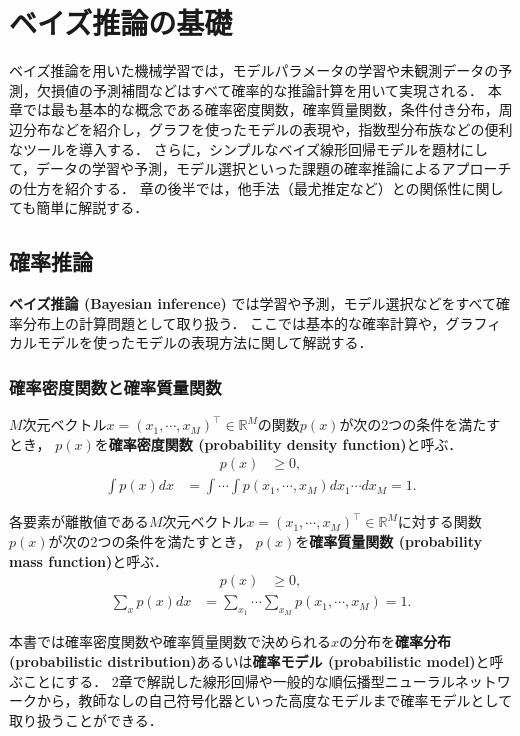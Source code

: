 \documentclass[11pt,a4paper]{jsarticle}
\numberwithin{equation}{section}
\begin{document}
	
\setcounter{section}{2}

\section{ベイズ推論の基礎}
ベイズ推論を用いた機械学習では，モデルパラメータの学習や未観測データの予測，欠損値の予測補間などはすべて確率的な推論計算を用いて実現される．
本章では最も基本的な概念である確率密度関数，確率質量関数，条件付き分布，周辺分布などを紹介し，グラフを使ったモデルの表現や，指数型分布族などの便利なツールを導入する．
さらに，シンプルなベイズ線形回帰モデルを題材にして，データの学習や予測，モデル選択といった課題の確率推論によるアプローチの仕方を紹介する．
章の後半では，他手法（最尤推定など）との関係性に関しても簡単に解説する．

\subsection{確率推論}
\textbf{ベイズ推論 (Bayesian inference)} では学習や予測，モデル選択などをすべて確率分布上の計算問題として取り扱う．
ここでは基本的な確率計算や，グラフィカルモデルを使ったモデルの表現方法に関して解説する．

\subsubsection{確率密度関数と確率質量関数}
$M$次元ベクトル$x = (x_1, \cdots, x_M)^\top \in \mathbb{R}^M$の関数$p(x)$が次の2つの条件を満たすとき，
$p(x)$を\textbf{確率密度関数 (probability density function)}と呼ぶ．
\begin{align}
p(x)
& \geq
0,
\end{align}
\begin{align}
\int p(x) dx
& =
\int \cdots \int p(x_1, \cdots, x_M) dx_1 \cdots dx_M = 1.
\end{align}

各要素が離散値である$M$次元ベクトル$x = (x_1, \cdots, x_M)^\top \in \mathbb{R}^M$に対する関数$p(x)$が次の2つの条件を満たすとき，
$p(x)$を\textbf{確率質量関数 (probability mass function)}と呼ぶ．
\begin{align}
p(x)
& \geq
0,
\end{align}
\begin{align}
\sum_x p(x) dx
& =
\sum_{x_1} \cdots \sum_{x_M} p(x_1, \cdots, x_M) = 1.
\end{align}

本書では確率密度関数や確率質量関数で決められる$x$の分布を\textbf{確率分布 (probabilistic distribution)}あるいは\textbf{確率モデル (probabilistic model)}と呼ぶことにする．
2章で解説した線形回帰や一般的な順伝播型ニューラルネットワークから，教師なしの自己符号化器といった高度なモデルまで確率モデルとして取り扱うことができる．
\end{document}
